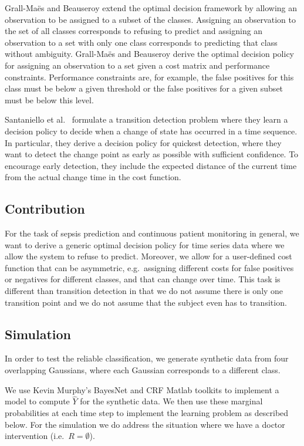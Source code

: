 \documentclass[12pt,solutions]{article}
\begin{document}
Grall-Ma\"{e}s and  Beauseroy \cite{GrallMaes2009} extend the optimal decision framework by allowing an observation to be assigned to a subset of the classes. Assigning an observation to the set of all classes corresponds to refusing to predict and assigning an observation to a set with only one class corresponds to predicting that class without ambiguity. Grall-Ma\"{e}s and  Beauseroy derive the optimal decision policy for assigning an observation to a set given a cost matrix and performance constraints. Performance constraints are, for example, the false positives for this class must be below a given threshold or the false positives for a given subset must be below this level.

Santaniello et al.\ \cite{Santaniello2012} formulate a transition detection problem where they learn a decision policy to decide when a change of state has occurred in a time sequence. In particular, they derive a decision policy for quickest detection, where they want to detect the change point as early as possible with sufficient confidence. To encourage early detection, they include the expected distance of the current time from the actual change time in the cost function. 


\subsection{Contribution}
For the task of sepsis prediction and continuous patient monitoring in general, we want to derive a generic optimal decision policy for time series data where we allow the system to refuse to predict. Moreover, we allow for a user-defined cost function that can be asymmetric, e.g.\ assigning different costs for false positives or negatives for different classes, and that can change over time. This task is different than transition detection in that we do not assume there is only one transition point and we do not assume that the subject even has to transition.


\subsection{Simulation}

In order to test the reliable classification, we generate synthetic data from four overlapping Gaussians, where each Gaussian corresponds to a different class.

We use Kevin Murphy's BayesNet and CRF Matlab toolkits to implement a model to compute $\hat{Y}$ for the synthetic data. We then use these marginal probabilities at each time step to implement the learning problem as described below. For the simulation we do address the situation where we have a doctor intervention (i.e.\ $R=\emptyset$). 
\end{document}
